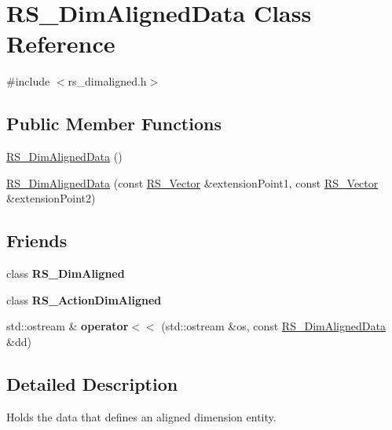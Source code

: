 \hypertarget{classRS__DimAlignedData}{\section{R\-S\-\_\-\-Dim\-Aligned\-Data Class Reference}
\label{classRS__DimAlignedData}
}


{\ttfamily \#include $<$rs\-\_\-dimaligned.\-h$>$}

\subsection*{Public Member Functions}
\begin{DoxyCompactItemize}
\item 
\hyperlink{classRS__DimAlignedData_a1b27d7c05cf1ad4bb54d01c2909fcfc8}{R\-S\-\_\-\-Dim\-Aligned\-Data} ()
\item 
\hyperlink{classRS__DimAlignedData_acfd10eab520303c3d21769d947ba4149}{R\-S\-\_\-\-Dim\-Aligned\-Data} (const \hyperlink{classRS__Vector}{R\-S\-\_\-\-Vector} \&extension\-Point1, const \hyperlink{classRS__Vector}{R\-S\-\_\-\-Vector} \&extension\-Point2)
\end{DoxyCompactItemize}
\subsection*{Friends}
\begin{DoxyCompactItemize}
\item 
\hypertarget{classRS__DimAlignedData_aea188e8c51baa951f78b172cf77aedcc}{class {\bfseries R\-S\-\_\-\-Dim\-Aligned}}\label{classRS__DimAlignedData_aea188e8c51baa951f78b172cf77aedcc}

\item 
\hypertarget{classRS__DimAlignedData_adf89e7a13764cd7fd4c9abe0aef55d17}{class {\bfseries R\-S\-\_\-\-Action\-Dim\-Aligned}}\label{classRS__DimAlignedData_adf89e7a13764cd7fd4c9abe0aef55d17}

\item 
\hypertarget{classRS__DimAlignedData_a22e0939ea5f6a5f137f310fc8d892120}{std\-::ostream \& {\bfseries operator$<$$<$} (std\-::ostream \&os, const \hyperlink{classRS__DimAlignedData}{R\-S\-\_\-\-Dim\-Aligned\-Data} \&dd)}\label{classRS__DimAlignedData_a22e0939ea5f6a5f137f310fc8d892120}

\end{DoxyCompactItemize}


\subsection{Detailed Description}
Holds the data that defines an aligned dimension entity. 

